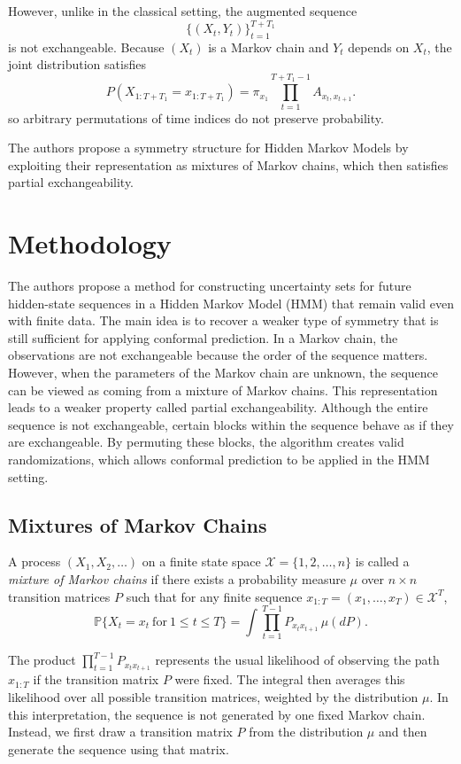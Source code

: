\documentclass{article}
\begin{document}
However, unlike in the classical setting,
the augmented sequence
\[
\{(X_t,Y_t)\}_{t=1}^{T+T_1}
\]
is not exchangeable. Because $(X_t)$ is a Markov chain and $Y_t$ depends on $X_t$, the joint distribution satisfies
\[
P(X_{1:T+T_1}=x_{1:T+T_1})
=
\pi_{x_1}
\prod_{t=1}^{T+T_1-1} A_{x_t,x_{t+1}}.
\]
so arbitrary permutations of time indices do not preserve probability.

The authors propose a symmetry structure for Hidden Markov Models by exploiting their representation as mixtures of Markov chains, which then satisfies partial exchangeability.

\section{Methodology}

The authors propose a method for constructing uncertainty sets for future hidden-state sequences in a Hidden Markov Model (HMM) that remain valid even with finite data. The main idea is to recover a weaker type of symmetry that is still sufficient for applying conformal prediction. In a Markov chain, the observations are not exchangeable because the order of the sequence matters. However, when the parameters of the Markov chain are unknown, the sequence can be viewed as coming from a mixture of Markov chains. This representation leads to a weaker property called partial exchangeability. Although the entire sequence is not exchangeable, certain blocks within the sequence behave as if they are exchangeable. By permuting these blocks, the algorithm creates valid randomizations, which allows conformal prediction to be applied in the HMM setting.

\subsection{Mixtures of Markov Chains}

A process $(X_1,X_2,\ldots)$ on a finite state space $\mathcal{X}=\{1,2,\ldots,n\}$ is called a \emph{mixture of Markov chains} if there exists a probability measure $\mu$ over $n\times n$ transition matrices $P$ such that for any finite sequence
$x_{1:T}=(x_1,\ldots,x_T)\in\mathcal{X}^T$,
\begin{equation}
\mathbb{P}\{X_t=x_t \ \text{for}\ 1\le t\le T\}
=
\int
\prod_{t=1}^{T-1} P_{x_t x_{t+1}}\,
\mu(dP).
\label{eq:mix_markov}
\end{equation}

The product $\prod_{t=1}^{T-1} P_{x_t x_{t+1}}$ represents the usual likelihood of observing the path $x_{1:T}$ if the transition matrix $P$ were fixed. The integral then averages this likelihood over all possible transition matrices, weighted by the distribution $\mu$. In this interpretation, the sequence is not generated by one fixed Markov chain. Instead, we first draw a transition matrix $P$ from the distribution $\mu$ and then generate the sequence using that matrix.
\end{document}
